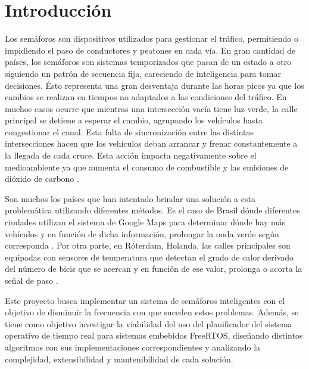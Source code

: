 \section{Introducción}
Los semáforos son dispositivos utilizados para gestionar el tráfico, permitiendo o impidiendo el paso de conductores y peatones en cada vía. En gran cantidad de países, los semáforos son sistemas temporizados
que pasan de un estado a otro siguiendo un patrón de secuencia fija, careciendo de inteligencia para tomar decisiones. Ésto representa una gran desventaja durante las horas picos ya que los cambios se realizan en tiempos no adaptados a las condiciones del tráfico. En muchos casos ocurre que mientras una intersección vacía tiene luz verde, la calle principal se detiene a esperar el cambio, agrupando los vehículos hasta congestionar el canal.
Esta falta de sincronización entre las distintas intersecciones hacen que los vehículos deban arrancar y frenar constantemente a la llegada de cada cruce. Esta acción impacta negativamente sobre el medioambiente ya que aumenta el consumo de combustible y las emisiones de dióxido de carbono \cite{ikporo}.

Son muchos los países que han intentado brindar una solución a esta problemática utilizando diferentes métodos. Es el caso de Brasil dónde diferentes ciudades utilizan el sistema de Google Maps para determinar dónde hay más vehículos y en función de dicha información, prolongar la onda verde según corresponda \cite{ant-brasil}.
Por otra parte, en Róterdam, Holanda, las calles principales son equipadas con sensores de temperatura que detectan el grado de calor derivado del número de bicis que se acercan y en función de ese valor, prolonga o acorta la señal de paso \cite{ant-holanda}.

Este proyecto busca implementar un sistema de semáforos inteligentes con el objetivo de disminuir la frecuencia con que suceden estos problemas. Además, se tiene como objetivo investigar la viabilidad del uso del planificador del sistema operativo de tiempo real para sistemas embebidos FreeRTOS, diseñando distintos algoritmos con sus implementaciones correspondientes y analizando la complejidad, extensibilidad y mantenibilidad de cada solución.
